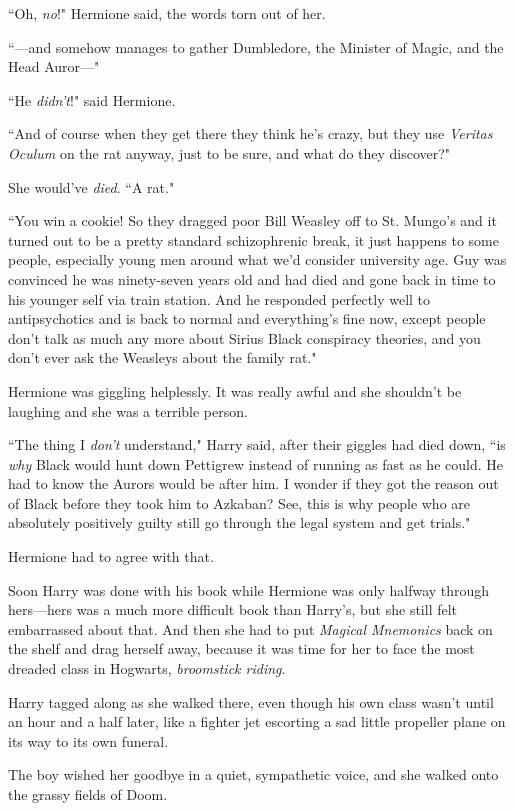 ``Oh, \emph{no}!" Hermione said, the words torn out of her.

``—and somehow manages to gather Dumbledore, the Minister of Magic, and the Head Auror—"

``He \emph{didn't}!" said Hermione.

``And of course when they get there they think he's crazy, but they use \emph{Veritas Oculum} on the rat anyway, just to be sure, and what do they discover?"

She would've \emph{died}. ``A rat."

``You win a cookie! So they dragged poor Bill Weasley off to St. Mungo's and it turned out to be a pretty standard schizophrenic break, it just happens to some people, especially young men around what we'd consider university age. Guy was convinced he was ninety-seven years old and had died and gone back in time to his younger self via train station. And he responded perfectly well to antipsychotics and is back to normal and everything's fine now, except people don't talk as much any more about Sirius Black conspiracy theories, and you don't ever ask the Weasleys about the family rat."

Hermione was giggling helplessly. It was really awful and she shouldn't be laughing and she was a terrible person.

``The thing I \emph{don't} understand," Harry said, after their giggles had died down, ``is \emph{why} Black would hunt down Pettigrew instead of running as fast as he could. He had to know the Aurors would be after him. I wonder if they got the reason out of Black before they took him to Azkaban? See, this is why people who are absolutely positively guilty still go through the legal system and get trials."

Hermione had to agree with that.

Soon Harry was done with his book while Hermione was only halfway through hers—hers was a much more difficult book than Harry's, but she still felt embarrassed about that. And then she had to put \emph{Magical Mnemonics} back on the shelf and drag herself away, because it was time for her to face the most dreaded class in Hogwarts, \emph{broomstick riding}.

Harry tagged along as she walked there, even though his own class wasn't until an hour and a half later, like a fighter jet escorting a sad little propeller plane on its way to its own funeral.

The boy wished her goodbye in a quiet, sympathetic voice, and she walked onto the grassy fields of Doom.

